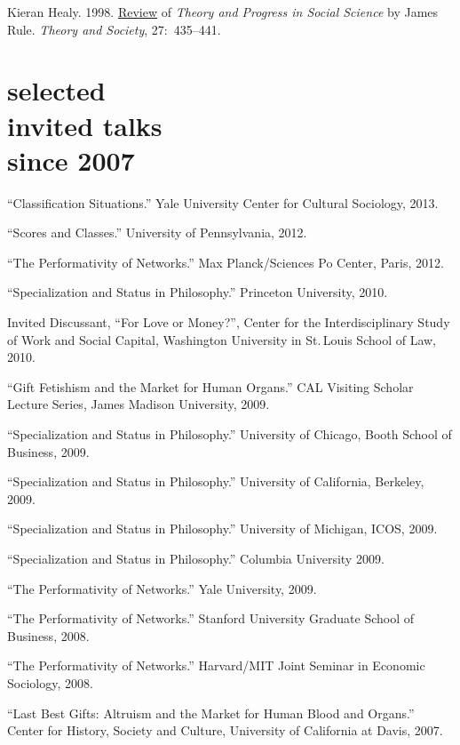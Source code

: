 \documentclass[11pt,oneside,a4paper,DIV=8]{scrartcl}
\begin{document}
Kieran Healy. 1998. \href{http://www.kieranhealy.org/files/reviews/rule.pdf}{Review} of \emph{Theory and Progress in Social Science} by James Rule.  \emph{Theory
  and Society}, 27:~435--441.

 
 

\section{selected \\ invited talks \\ since 2007}



``Classification Situations.'' Yale University Center for Cultural Sociology, 2013.
 
``Scores and Classes.'' University of Pennsylvania, 2012.

``The Performativity of Networks.'' Max Planck/Sciences Po Center, Paris, 2012. 
 
``Specialization and Status in Philosophy.'' Princeton University, 2010. 

Invited Discussant, ``For Love or Money?'', Center for the Interdisciplinary Study of Work and Social Capital, Washington University in St.\,Louis School of Law, 2010. 

``Gift Fetishism and the Market for Human Organs.'' CAL Visiting Scholar Lecture Series, James Madison University, 2009. 

``Specialization and Status in Philosophy.'' University of Chicago, Booth School of Business, 2009. 

``Specialization and Status in Philosophy.'' University of California, Berkeley, 2009. 

``Specialization and Status in Philosophy.'' University of Michigan, ICOS, 2009. 

``Specialization and Status in Philosophy.'' Columbia University 2009. 

``The Performativity of Networks.'' Yale University, 2009. 

``The Performativity of Networks.'' Stanford University Graduate School of Business, 2008. 

``The Performativity of Networks.'' Harvard/MIT Joint Seminar in Economic Sociology, 2008. 

``Last Best Gifts: Altruism and the Market for Human Blood and Organs.'' Center for History, Society and Culture, University of California at Davis, 2007. 
\end{document}
